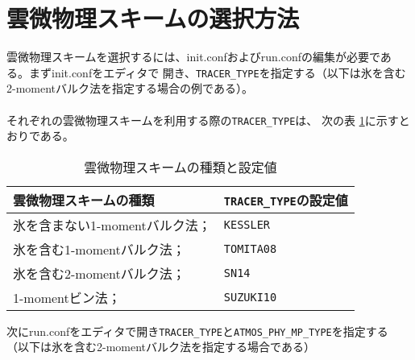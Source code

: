 \section{雲微物理スキームの選択方法}
雲微物理スキームを選択するには、init.confおよびrun.confの編集が必要である。まずinit.confをエディタで
開き、\verb|TRACER_TYPE|を指定する（以下は氷を含む2-momentバルク法を指定する場合の例である）。\\

\\

それぞれの雲微物理スキームを利用する際の\verb|TRACER_TYPE|は、
次の表 \ref{tab:mp_trc_type}に示すとおりである。

\begin{table}[htb]
\begin{center}
\caption{雲微物理スキームの種類と設定値}
\begin{tabularx}{150mm}{|l|X|} \hline
 \rowcolor[gray]{0.9} 雲微物理スキームの種類 & \verb|TRACER_TYPE|の設定値 \\ \hline
 氷を含まない1-momentバルク法；\cite{kessler_1969}    & \verb|KESSLER| \\ \hline           
 氷を含む1-momentバルク法；\cite{tomita_2008}         & \verb|TOMITA08| \\ \hline
 氷を含む2-momentバルク法；\cite{sn_2014}             & \verb|SN14| \\ \hline
 1-momentビン法；\cite{suzuki_etal_2010}             & \verb|SUZUKI10| \\ \hline
\end{tabularx}
\label{tab:mp_trc_type}
\end{center}
\end{table}

次にrun.confをエディタで開き\verb|TRACER_TYPE|と\verb|ATMOS_PHY_MP_TYPE|を指定する
（以下は氷を含む2-momentバルク法を指定する場合である）\\

\\

